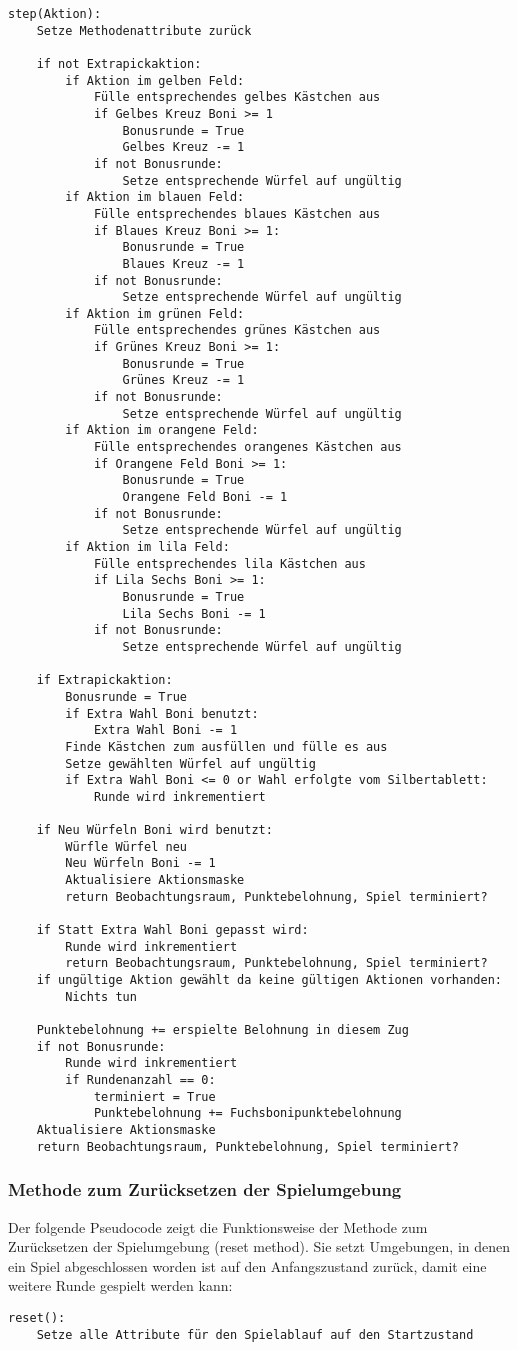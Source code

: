 \begin{lstlisting}[caption={Schritt Methode}]
step(Aktion):
	Setze Methodenattribute zurück
	
	if not Extrapickaktion:
		if Aktion im gelben Feld:
			Fülle entsprechendes gelbes Kästchen aus
			if Gelbes Kreuz Boni >= 1
				Bonusrunde = True
				Gelbes Kreuz -= 1
			if not Bonusrunde:
				Setze entsprechende Würfel auf ungültig
		if Aktion im blauen Feld:
			Fülle entsprechendes blaues Kästchen aus
			if Blaues Kreuz Boni >= 1:
				Bonusrunde = True
				Blaues Kreuz -= 1
			if not Bonusrunde:
				Setze entsprechende Würfel auf ungültig
		if Aktion im grünen Feld:
			Fülle entsprechendes grünes Kästchen aus
			if Grünes Kreuz Boni >= 1:
				Bonusrunde = True
				Grünes Kreuz -= 1
			if not Bonusrunde:
				Setze entsprechende Würfel auf ungültig
		if Aktion im orangene Feld:
			Fülle entsprechendes orangenes Kästchen aus
			if Orangene Feld Boni >= 1:
				Bonusrunde = True
				Orangene Feld Boni -= 1
			if not Bonusrunde:
				Setze entsprechende Würfel auf ungültig
		if Aktion im lila Feld:
			Fülle entsprechendes lila Kästchen aus
			if Lila Sechs Boni >= 1:
				Bonusrunde = True
				Lila Sechs Boni -= 1
			if not Bonusrunde:
				Setze entsprechende Würfel auf ungültig
	
	if Extrapickaktion:
		Bonusrunde = True
		if Extra Wahl Boni benutzt:
			Extra Wahl Boni -= 1
		Finde Kästchen zum ausfüllen und fülle es aus
		Setze gewählten Würfel auf ungültig
		if Extra Wahl Boni <= 0 or Wahl erfolgte vom Silbertablett:
			Runde wird inkrementiert
			
	if Neu Würfeln Boni wird benutzt:
		Würfle Würfel neu
		Neu Würfeln Boni -= 1
		Aktualisiere Aktionsmaske
		return Beobachtungsraum, Punktebelohnung, Spiel terminiert?
		
	if Statt Extra Wahl Boni gepasst wird:
		Runde wird inkrementiert
		return Beobachtungsraum, Punktebelohnung, Spiel terminiert?
	if ungültige Aktion gewählt da keine gültigen Aktionen vorhanden:
		Nichts tun
			
	Punktebelohnung += erspielte Belohnung in diesem Zug
	if not Bonusrunde:
		Runde wird inkrementiert
		if Rundenanzahl == 0:
			terminiert = True
			Punktebelohnung += Fuchsbonipunktebelohnung
	Aktualisiere Aktionsmaske
	return Beobachtungsraum, Punktebelohnung, Spiel terminiert?		
\end{lstlisting}
\subsubsection{Methode zum Zurücksetzen der Spielumgebung}
\begin{minipage}{\linewidth}
Der folgende Pseudocode zeigt die Funktionsweise der Methode zum Zurücksetzen der Spielumgebung (reset method). Sie setzt Umgebungen, in denen ein Spiel abgeschlossen worden ist auf den Anfangszustand zurück, damit eine weitere Runde gespielt werden kann:
\vspace{0.5cm}
\begin{lstlisting}[caption={Methode zum Zurücksetzen der Umgebung}]
reset():
	Setze alle Attribute für den Spielablauf auf den Startzustand
\end{lstlisting}
\end{minipage}

